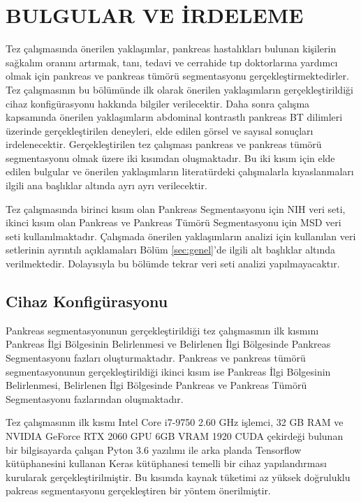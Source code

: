 \chapter{BULGULAR VE İRDELEME \label{sec:YapilanCalismalar}}

Tez çalışmasında önerilen yaklaşımlar, pankreas hastalıkları bulunan kişilerin sağkalım oranını artırmak, tanı, tedavi ve cerrahide tıp doktorlarına yardımcı olmak için pankreas ve pankreas tümörü segmentasyonu gerçekleştirmektedirler. Tez çalışmasının bu bölümünde ilk olarak önerilen yaklaşımların gerçekleştirildiği cihaz konfigürasyonu hakkında bilgiler verilecektir. Daha sonra çalışma kapsamında önerilen yaklaşımların abdominal kontrastlı pankreas BT dilimleri üzerinde gerçekleştirilen deneyleri, elde edilen görsel ve sayısal sonuçları irdelenecektir. Gerçekleştirilen tez çalışması pankreas ve pankreas tümörü segmentasyonu olmak üzere iki kısımdan oluşmaktadır. Bu iki kısım için elde edilen bulgular ve önerilen yaklaşımların literatürdeki çalışmalarla kıyaslanmaları ilgili ana başlıklar altında ayrı ayrı verilecektir.
 
Tez çalışmasında birinci kısım olan Pankreas Segmentasyonu için NIH veri seti, ikinci kısım olan Pankreas ve Pankreas Tümörü Segmentasyonu için MSD veri seti kullanılmaktadır. Çalışmada önerilen yaklaşımların analizi için kullanılan veri setlerinin ayrıntılı açıklamaları Bölüm \ref{sec:genel}’de ilgili alt başlıklar altında verilmektedir. Dolayısıyla bu bölümde tekrar veri seti analizi yapılmayacaktır. 

\section{Cihaz Konfigürasyonu}
Pankreas segmentasyonunun gerçekleştirildiği tez çalışmasının ilk kısmını Pankreas İlgi Bölgesinin Belirlenmesi ve Belirlenen İlgi Bölgesinde Pankreas Segmentasyonu fazları oluşturmaktadır. Pankreas ve pankreas tümörü segmentasyonunun gerçekleştirildiği ikinci kısım ise Pankreas İlgi Bölgesinin Belirlenmesi, Belirlenen İlgi Bölgesinde Pankreas ve Pankreas Tümörü Segmentasyonu fazlarından oluşmaktadır. 

Tez çalışmasının ilk kısmı Intel Core i7-9750 2.60 GHz işlemci, 32 GB RAM ve NVIDIA GeForce RTX 2060 GPU 6GB VRAM 1920 CUDA çekirdeği bulunan bir bilgisayarda çalışan Pyton 3.6 yazılımı ile arka planda Tensorflow kütüphanesini kullanan Keras kütüphanesi temelli bir cihaz yapılandırması kurularak gerçekleştirilmiştir. Bu kısımda kaynak tüketimi az yüksek doğruluklu pakreas segmentasyonu gerçekleştiren bir yöntem önerilmiştir.

